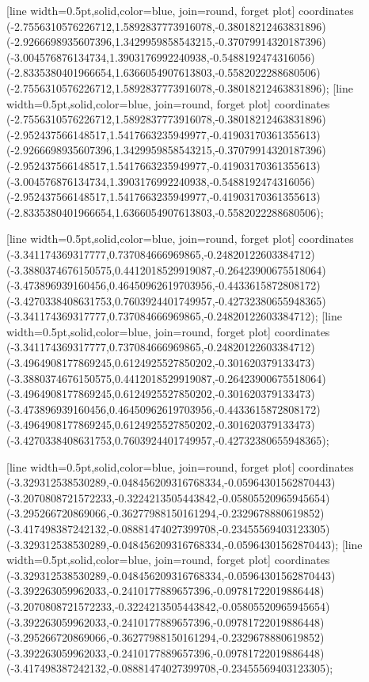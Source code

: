 [line width=0.5pt,solid,color=blue, join=round, forget plot] coordinates {(-2.7556310576226712,1.5892837773916078,-0.38018212463831896) (-2.9266698935607396,1.3429959858543215,-0.37079914320187396) (-3.004576876134734,1.3903176992240938,-0.5488192474316056) (-2.8335380401966654,1.6366054907613803,-0.5582022288680506) (-2.7556310576226712,1.5892837773916078,-0.38018212463831896)};
[line width=0.5pt,solid,color=blue, join=round, forget plot] coordinates {(-2.7556310576226712,1.5892837773916078,-0.38018212463831896) (-2.952437566148517,1.5417663235949977,-0.41903170361355613) (-2.9266698935607396,1.3429959858543215,-0.37079914320187396) (-2.952437566148517,1.5417663235949977,-0.41903170361355613) (-3.004576876134734,1.3903176992240938,-0.5488192474316056) (-2.952437566148517,1.5417663235949977,-0.41903170361355613) (-2.8335380401966654,1.6366054907613803,-0.5582022288680506)};

[line width=0.5pt,solid,color=blue, join=round, forget plot] coordinates {(-3.341174369317777,0.737084666969865,-0.24820122603384712) (-3.3880374676150575,0.4412018529919087,-0.26423900675518064) (-3.473896939160456,0.46450962619703956,-0.4433615872808172) (-3.4270338408631753,0.7603924401749957,-0.42732380655948365) (-3.341174369317777,0.737084666969865,-0.24820122603384712)};
[line width=0.5pt,solid,color=blue, join=round, forget plot] coordinates {(-3.341174369317777,0.737084666969865,-0.24820122603384712) (-3.4964908177869245,0.6124925527850202,-0.301620379133473) (-3.3880374676150575,0.4412018529919087,-0.26423900675518064) (-3.4964908177869245,0.6124925527850202,-0.301620379133473) (-3.473896939160456,0.46450962619703956,-0.4433615872808172) (-3.4964908177869245,0.6124925527850202,-0.301620379133473) (-3.4270338408631753,0.7603924401749957,-0.42732380655948365)};

[line width=0.5pt,solid,color=blue, join=round, forget plot] coordinates {(-3.329312538530289,-0.048456209316768334,-0.05964301562870443) (-3.2070808721572233,-0.3224213505443842,-0.05805520965945654) (-3.295266720869066,-0.36277988150161294,-0.2329678880619852) (-3.417498387242132,-0.08881474027399708,-0.23455569403123305) (-3.329312538530289,-0.048456209316768334,-0.05964301562870443)};
[line width=0.5pt,solid,color=blue, join=round, forget plot] coordinates {(-3.329312538530289,-0.048456209316768334,-0.05964301562870443) (-3.392263059962033,-0.2410177889657396,-0.09781722019886448) (-3.2070808721572233,-0.3224213505443842,-0.05805520965945654) (-3.392263059962033,-0.2410177889657396,-0.09781722019886448) (-3.295266720869066,-0.36277988150161294,-0.2329678880619852) (-3.392263059962033,-0.2410177889657396,-0.09781722019886448) (-3.417498387242132,-0.08881474027399708,-0.23455569403123305)};

